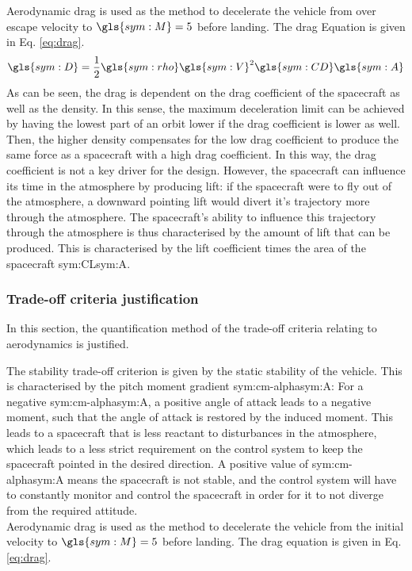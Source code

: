 Aerodynamic drag is used as the method to decelerate the vehicle from over escape velocity to $\gls{sym:M}=5$ before landing. The drag Equation is given in Eq. \ref{eq:drag}.
\begin{equation} \label{eq:drag}
\gls{sym:D} = \frac{1}{2}\gls{sym:rho}\gls{sym:V}^2\gls{sym:CD}\gls{sym:A}
\end{equation}
As can be seen, the drag is dependent on the drag coefficient of the spacecraft as well as the density. In this sense, the maximum deceleration limit can be achieved by having the lowest part of an orbit lower if the drag coefficient is lower as well. Then, the higher density compensates for the low drag coefficient to produce the same force as a spacecraft with a high drag coefficient. In this way, the drag coefficient is not a key driver for the design. However, the spacecraft can influence its time in the atmosphere by producing lift: if the spacecraft were to fly out of the atmosphere, a downward pointing lift would divert it's trajectory more through the atmosphere. The spacecraft's ability to influence this trajectory through the atmosphere is thus characterised by the amount of lift that can be produced. This is characterised by the lift coefficient times the area of the spacecraft \gls{sym:CL}\gls{sym:A}.

\subsubsection{Trade-off criteria justification} \label{sec:tradeoffaero}
In this section, the quantification method of the trade-off criteria relating to aerodynamics is justified.

The stability trade-off criterion is given by the static stability of the vehicle. This is characterised by the pitch moment gradient \gls{sym:cm-alpha}\gls{sym:A}: For a negative \gls{sym:cm-alpha}\gls{sym:A}, a positive angle of attack leads to a negative moment, such that the angle of attack is restored by the induced moment. This leads to a spacecraft that is less reactant to disturbances in the atmosphere, which leads to a less strict requirement on the control system to keep the spacecraft pointed in the desired direction. A positive value of \gls{sym:cm-alpha}\gls{sym:A} means the spacecraft is not stable, and the control system will have to constantly monitor and control the spacecraft in order for it to not diverge from the required attitude. \\


Aerodynamic drag is used as the method to decelerate the vehicle from the initial velocity to $\gls{sym:M}=5$ before landing. The drag equation is given in Eq. \ref{eq:drag}.

